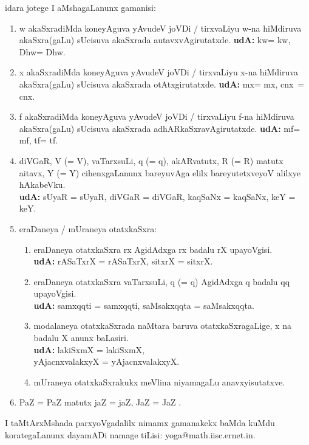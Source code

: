 \documentclass{article}
\begin{document}
\bigskip
idara jotege I
aMshagaLanunx gamanisi:
\begin{enumerate}
\renewcommand{\labelenumi}{\theenumi)}
\item 
{\rm w} akaSxradiMda
koneyAguva yAvudeV joVDi / tirxvaLiyu {\rm w}-na hiMdiruva akaSxra(gaLu)
\hbox{sUcisuva} akaSxrada autavxvAgirutatxde. 
{\bf udA:} {\rm kw}= kw, {\rm Dhw}= Dhw.
\item
{\rm x} akaSxradiMda koneyAguva yAvudeV joVDi / tirxvaLiyu {\rm x}-na
hiMdiruva akaSxra(gaLu) sUcisuva akaSxrada otAtxgirutatxde. 
{\bf udA:} {\rm mx}=
\kern3pt\hbox{mx}, {\rm cnx}~=~
\kern3pt\hbox{cnx}. 

\item 
{\rm f} akaSxradiMda
koneyAguva yAvudeV joVDi / tirxvaLiyu {\rm f}-na hiMdiruva akaSxra(gaLu)
sUcisuva akaSxrada adhAR\-kaSxravAgirutatxde. 
{\bf udA:} {\rm mf}= mf, {\rm tf}= tf.
\item
diVGaR, V (= {\rm V}), vaTarxsuLi, \hbox{q} (= {\rm q}),
akARvatutx, R (= {\rm R}) matutx aitavx, \hbox{Y} (= {\rm Y})
cihenxgaLanunx bareyuvAga elilx bareyu\-tetxveyoV alilxye hAkabeVku. \\
{\bf udA:} {\rm sUyaR} = sUyaR, {\rm diVGaR} = diVGaR, {\rm kaqSaNx} = kaqSaNx, {\rm keY} =
keY.
\item
eraDaneya / mUraneya otatxkaSxra: 
\begin{enumerate}
\item
eraDaneya otatxkaSxra \kern4pt\hbox{rx} AgidAdxga {\rm rx} badalu
{\rm rX} upayoVgisi.\\ 
{\bf udA:} rASaTxrX = {\rm rASaTxrX}, sitxrX = {\rm sitxrX}.
\item
eraDaneya otatxkaSxra vaTarxsuLi, \hbox{q} (= {\rm q}) AgidAdxga
{\rm q} badalu {\rm qq} upayoVgisi.\\ 
{\bf udA:} samxqqti = {\rm samxqqti}, saMsakxqqta = {\rm saMsakxqqta}. 
\item
modalaneya otatxkaSxrada naMtara baruva otatxkaSxragaLige, {\rm x} na badalu
{\rm X} anunx baLasiri.\\
{\bf udA:} lakiSxmX = {\rm lakiSxmX},\\
\phantom{udA:} yAjacnxvalakxyX = {\rm yAjacnxvalakxyX}.
\item%
mUraneya  otatxkaSxrakukx meVlina niyamagaLu anavxyisutatxve.\\
\end{enumerate}
\item
PaZ = {\rm PaZ} matutx jaZ = {\rm jaZ}, JaZ = {\rm JaZ} .

\end{enumerate}

\medskip
I taMtArxMshada parxyoVgadalilx nimamx gamanakekx baMda kuMdu korategaLanunx
dayamADi namage tiLisi: {\rm yoga@math.iisc.ernet.in}.

\vfil
\noindent
{}
\end{document}

